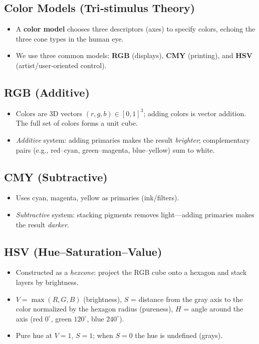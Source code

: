 \documentclass[10pt,twocolumn]{extarticle}
\begin{document}
\subsection*{Color Models (Tri‐stimulus Theory)}
\begin{itemize}
  \item A \textbf{color model} chooses three descriptors (axes) to specify colors, echoing the three cone types in the human eye.
  \item We use three common models: \textbf{RGB} (displays), \textbf{CMY} (printing), and \textbf{HSV} (artist/user‐oriented control).
\end{itemize}

\subsection*{RGB (Additive)}
\begin{itemize}
  \item Colors are 3D vectors $(r,g,b)\in[0,1]^3$; adding colors is vector addition. The full set of colors forms a unit cube.
  \item \emph{Additive} system: adding primaries makes the result \emph{brighter}; complementary pairs (e.g., red–cyan, green–magenta, blue–yellow) sum to white.
\end{itemize}

\subsection*{CMY (Subtractive)}
\begin{itemize}
  \item Uses cyan, magenta, yellow as primaries (ink/filters).
  \item \emph{Subtractive} system: stacking pigments removes light—adding primaries makes the result \emph{darker}.
\end{itemize}

\subsection*{HSV (Hue–Saturation–Value)}
\begin{itemize}
  \item Constructed as a \emph{hexcone}: project the RGB cube onto a hexagon and stack layers by brightness.
  \item $V=\max(R,G,B)$ (brightness), \; $S$ = distance from the gray axis to the color normalized by the hexagon radius (pureness), \; $H$ = angle around the axis (red $0^\circ$, green $120^\circ$, blue $240^\circ$).
  \item Pure hue at $V=1,\,S=1$; when $S=0$ the hue is undefined (grays).
\end{itemize}
\end{document}
